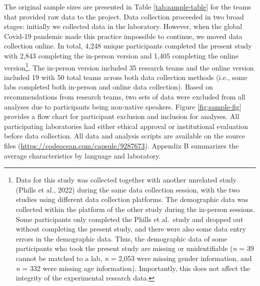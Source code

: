 \documentclass[
  man,floatsintext]{apa7}
\begin{document}
The original sample sizes are presented in Table \ref{tab:sample-table}
for the teams that provided raw data to the project. Data collection
proceeded in two broad stages: initially we collected data in the
laboratory. However, when the global Covid-19 pandemic made this
practice impossible to continue, we moved data collection online. In
total,
4,248
unique participants completed the present study with
2,843
completing the in-person version and
1,405
completing the online version\footnote{Data for this study was collected together with another unrelated
  study (Phills et al., 2022) during the same data collection
  session, with the two studies using different data collection
  platforms. The demographic data was collected within the platform of
  the other study during the in-person sessions. Some participants
  only completed the Phills et al.~study and dropped out without
  completing the present study, and there were also some data entry
  errors in the demographic data. Thus, the demographic data of some
  participants who took the present study are missing or
  unidentifiable (\emph{n} =
  39
  cannot be matched to a lab, \emph{n} =
  2,053
  were missing gender information, and \emph{n} =
  332 were missing age
  information). Importantly, this does not affect the integrity of the
  experimental research data.}. The in-person version included
35
research teams and the online version included
19
with 50 total teams across both data
collection methods (i.e., some labs completed both in-person and online
data collection). Based on recommendations from research teams, two sets
of data were excluded from all analyses due to participants being
non-native speakers. Figure \ref{fig:sample-fig} provides a flow chart
for participant exclusion and inclusion for analyses. All participating
laboratories had either ethical approval or institutional evaluation
before data collection. All data and analysis scripts are available on
the source files (\url{https://codeocean.com/capsule/9287673}). Appendix B
summarizes the average characteristics by language and laboratory.
\end{document}
